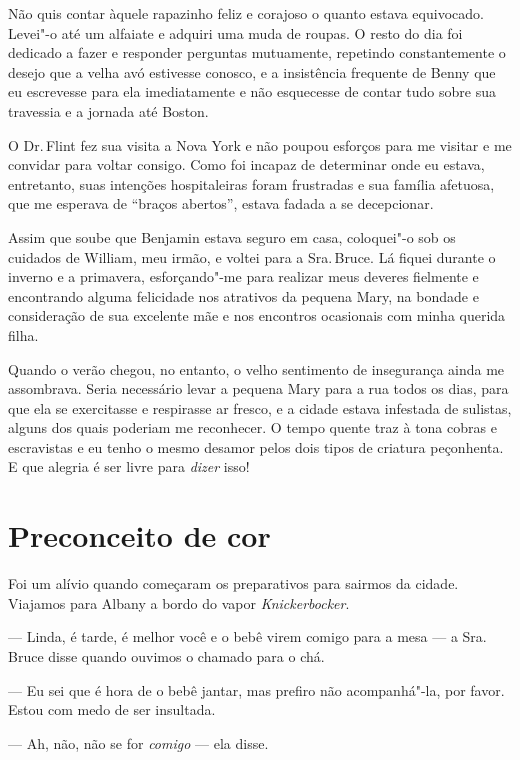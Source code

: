 Não quis contar àquele rapazinho feliz
e corajoso o quanto estava equivocado. Levei"-o até um alfaiate e adquiri
uma muda de roupas. O resto do dia foi dedicado a fazer e responder
perguntas mutuamente, repetindo constantemente o desejo que a velha avó
estivesse conosco, e a insistência frequente de Benny que eu escrevesse
para ela imediatamente e não esquecesse de contar tudo sobre sua
travessia e a jornada até Boston.

O Dr.\,Flint fez sua visita a Nova York
e não poupou esforços para me visitar e me convidar para voltar consigo.
Como foi incapaz de determinar onde eu estava, entretanto, suas
intenções hospitaleiras foram frustradas e sua família afetuosa, que me
esperava de ``braços abertos'', estava fadada a se decepcionar.

Assim que soube que Benjamin estava
seguro em casa, coloquei"-o sob os cuidados de William, meu irmão, e
voltei para a Sra.\,Bruce. Lá fiquei durante o inverno e a primavera,
esforçando"-me para realizar meus deveres fielmente e encontrando alguma
felicidade nos atrativos da pequena Mary, na bondade e consideração de
sua excelente mãe e nos encontros ocasionais com minha querida filha.

Quando o verão chegou, no entanto, o
velho sentimento de insegurança ainda me assombrava. Seria necessário
levar a pequena Mary para a rua todos os dias, para que ela se
exercitasse e respirasse ar fresco, e a cidade estava infestada de
sulistas, alguns dos quais poderiam me reconhecer. O tempo quente traz à
tona cobras e escravistas e eu tenho o mesmo desamor pelos dois tipos de
criatura peçonhenta. E que alegria é ser livre para \emph{dizer} isso!

\chapter*{Preconceito de cor}

Foi um alívio quando começaram os
preparativos para sairmos da cidade. Viajamos para Albany a bordo do
vapor \emph{Knickerbocker}.

--- Linda, é tarde, é melhor você e o bebê virem comigo para a mesa ---
a Sra.\,Bruce disse quando ouvimos o chamado para o chá.

--- Eu sei que é hora de o bebê jantar, mas prefiro não acompanhá"-la,
por favor. Estou com medo de ser insultada.

--- Ah, não, não se for \emph{comigo} --- ela disse.

